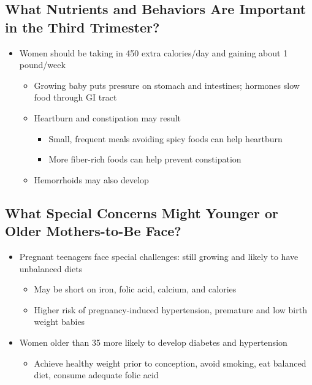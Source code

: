 \documentclass[12pt]{article}
\begin{document}
        \subsection{What Nutrients and Behaviors Are Important in the Third Trimester?}
            \begin{itemize}
                \item Women should be taking in 450 extra calories/day and gaining about 1 pound/week
                    \begin{itemize}
                        \item Growing baby puts pressure on stomach and intestines; hormones slow food through GI tract
                        \item Heartburn and constipation may result
                            \begin{itemize}
                                \item Small, frequent meals avoiding spicy foods can help heartburn
                                \item More fiber-rich foods can help prevent constipation
                            \end{itemize}
                        \item Hemorrhoids may also develop
                    \end{itemize}
            \end{itemize}

        \subsection{What Special Concerns Might Younger or Older Mothers-to-Be Face?}
            \begin{itemize}
                \item Pregnant teenagers face special challenges: still growing and likely to have unbalanced diets
                    \begin{itemize}
                        \item May be short on iron, folic acid, calcium, and calories
                        \item Higher risk of pregnancy-induced hypertension, premature and low birth weight babies
                    \end{itemize}
                \item Women older than 35 more likely to develop diabetes and hypertension
                    \begin{itemize}
                        \item Achieve healthy weight prior to conception, avoid smoking, eat balanced diet, consume adequate folic acid
                    \end{itemize}
            \end{itemize}
\end{document}
